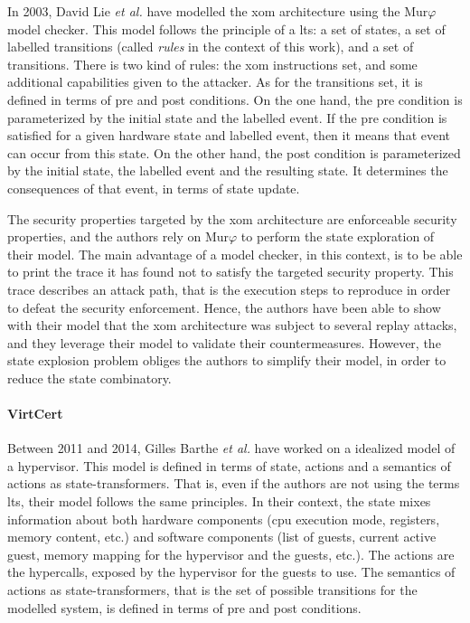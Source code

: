 In 2003, David Lie \emph{et al.} have modelled the \ac{xom} architecture using
the Mur$\varphi$ model checker.
%
This model follows the principle of a \ac{lts}: a set of states, a set of
labelled transitions (called \emph{rules} in the context of this work), and a
set of transitions.
%
There is two kind of rules: the \ac{xom} instructions set, and some additional
capabilities given to the attacker.
%
As for the transitions set, it is defined in terms of pre and post conditions.
%
On the one hand, the pre condition is parameterized by the initial state and the
labelled event.
%
If the pre condition is satisfied for a given hardware state and labelled event,
then it means that event can occur from this state.
%
On the other hand, the post condition is parameterized by the initial state, the
labelled event and the resulting state.
%
It determines the consequences of that event, in terms of state update.

The security properties targeted by the \ac{xom} architecture are enforceable
security properties, and the authors rely on Mur$\varphi$ to perform the state
exploration of their model.
%
The main advantage of a model checker, in this context, is to be able to print
the trace it has found not to satisfy the targeted security property.
%
This trace describes an attack path, that is the execution steps to reproduce in
order to defeat the security enforcement.
%
Hence, the authors have been able to show with their model that the \ac{xom}
architecture was subject to several replay attacks, and they leverage their
model to validate their countermeasures.
%
However, the state explosion problem obliges the authors to simplify their
model, in order to reduce the state combinatory.

\paragraph{VirtCert}
%
Between 2011 and 2014, Gilles Barthe \emph{et al.} have worked on a idealized
model of a hypervisor.
%
This model is defined in terms of state, actions and a semantics of actions as
state-transformers.
%
That is, even if the authors are not using the terms \ac{lts}, their model
follows the same principles.
%
In their context, the state mixes information about both hardware components
(\ac{cpu} execution mode, registers, memory content, etc.) and software
components (list of guests, current active guest, memory mapping for the
hypervisor and the guests, etc.).
%
The actions are the hypercalls, exposed by the hypervisor for the guests to use.
%
The semantics of actions as state-transformers, that is the set of possible
transitions for the modelled system, is defined in terms of pre and post
conditions.


